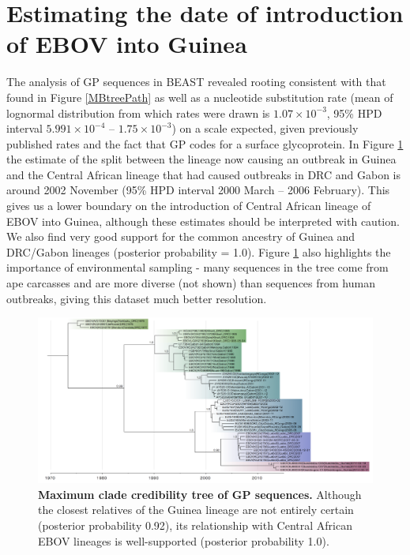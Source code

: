\documentclass[11pt,oneside,letterpaper]{article}
\begin{document}
\section*{Estimating the date of introduction of EBOV into Guinea}
The analysis of GP sequences in BEAST revealed rooting consistent with that found in Figure \ref{MBtreePath} as well as a nucleotide substitution rate (mean of lognormal distribution from which rates were drawn is $1.07\times10^{-3}$, 95\% HPD interval $5.991\times10^{-4}$ -- $1.75\times10^{-3}$) on a scale expected, given previously published rates \cite{carroll2013} and the fact that GP codes for a surface glycoprotein.
In Figure \ref{beastTree} the estimate of the split between the lineage now causing an outbreak in Guinea and the Central African lineage that had caused outbreaks in DRC and Gabon is around 2002 November (95\% HPD interval 2000 March -- 2006 February).
This gives us a lower boundary on the introduction of Central African lineage of EBOV into Guinea, although these estimates should be interpreted with caution.
We also find very good support for the common ancestry of Guinea and DRC/Gabon lineages (posterior probability = 1.0).
Figure \ref{beastTree} also highlights the importance of environmental sampling - many sequences in the tree come from ape carcasses and are more diverse (not shown) than sequences from human outbreaks, giving this dataset much better resolution.

\begin{figure}[h!]
\centering  
\includegraphics[width=1\textwidth]  {figures/EBOV_GP_46_GTRG_UCLN_EGC_MCC_tree.png}
\caption{\textbf{Maximum clade credibility tree of GP sequences.}
Although the closest relatives of the Guinea lineage are not entirely certain (posterior probability 0.92), its relationship with Central African EBOV lineages is well-supported (posterior probability 1.0).}
\label{beastTree}
\end{figure}
\end{document}
